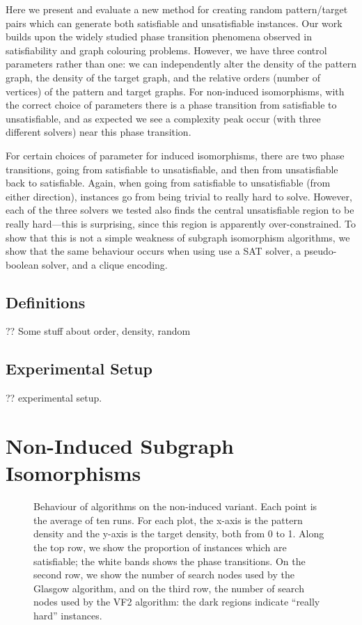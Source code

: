 \documentclass[letterpaper]{article}
\begin{document}
Here we present and evaluate a new method for creating random pattern/target pairs which can
generate both satisfiable and unsatisfiable instances. Our work builds upon the widely studied phase
transition phenomena observed in satisfiability and graph colouring problems. However, we have three
control parameters rather than one: we can independently alter the density of the pattern graph, the
density of the target graph, and the relative orders (number of vertices) of the pattern and target
graphs.  For non-induced isomorphisms, with the correct choice of parameters there is a phase
transition from satisfiable to unsatisfiable, and as expected we see a complexity peak occur (with
three different solvers) near this phase transition.

For certain choices of parameter for induced isomorphisms, there are two phase transitions, going
from satisfiable to unsatisfiable, and then from unsatisfiable back to satisfiable. Again, when
going from satisfiable to unsatisfiable (from either direction), instances go from being trivial to
really hard to solve. However, each of the three solvers we tested also finds the central
unsatisfiable region to be really hard---this is surprising, since this region is apparently
over-constrained. To show that this is not a simple weakness of subgraph isomorphism algorithms, we
show that the same behaviour occurs when using use a SAT solver, a pseudo-boolean solver, and a
clique encoding.

\subsection{Definitions}

?? Some stuff about order, density, random

\subsection{Experimental Setup}

?? experimental setup.

\section{Non-Induced Subgraph Isomorphisms}

\begin{figure}[h]
    
    \setlength{\abovecaptionskip}{-1.5em}
    \caption{Behaviour of algorithms on the non-induced variant. Each point is the average of ten
        runs. For each plot, the x-axis is the pattern density and the y-axis is the target
        density, both from 0 to 1. Along the top row, we show the proportion of instances which are
        satisfiable; the white bands shows the phase transitions. On the second row, we show the
        number of search nodes used by the Glasgow algorithm, and on the third row, the number of
        search nodes used by the VF2 algorithm: the dark regions indicate ``really hard''
        instances.}
    \label{figure:non-induced}
\end{figure}
\end{document}
